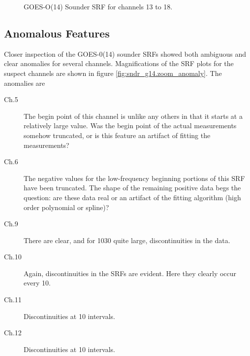 \begin{figure}[htp]
\begin{tabular}{c c}
  \end{tabular}
  \caption{GOES-O(14) Sounder SRF for channels 13 to 18.}
  \label{fig:sndr_g14.ch13-18}
\end{figure}

\subsection{Anomalous Features}
Closer inspection of the GOES-0(14) sounder SRFs showed both ambiguous and clear anomalies for several channels. Magnifications of the SRF plots for the suspect channels are shown in figure \ref{fig:sndr_g14.zoom_anomaly}. The anomalies are
\begin{description}
  \item[Ch.5] The begin point of this channel is unlike any others in that it starts at a relatively large value. Was the begin point of the actual measurements somehow truncated, or is this feature an artifact of fitting the measurements?
  \item[Ch.6] The negative values for the low-frequency beginning portions of this SRF have been truncated. The shape of the remaining positive data begs the question: are these data real or an artifact of the fitting algorithm (high order polynomial or spline)?
  \item[Ch.9] There are clear, and for 1030\invcm{} quite large, discontinuities in the data.
  \item[Ch.10] Again, discontinuities in the SRFs are evident. Here they clearly occur every 10\invcm{}.
  \item[Ch.11] Discontinuities at 10\invcm{} intervals.
  \item[Ch.12] Discontinuities at 10\invcm{} intervals.
\end{description}

